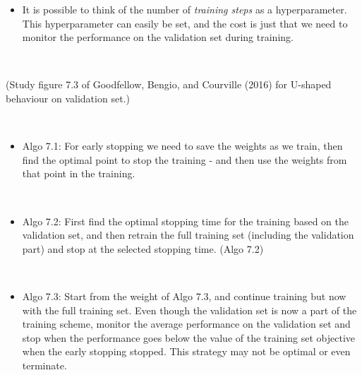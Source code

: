 \documentclass[
  ignorenonframetext,
]{beamer}
\providecommand{\tightlist}{%
  \setlength{\itemsep}{0pt}\setlength{\parskip}{0pt}}
\begin{document}
\begin{frame}
\begin{itemize}
\tightlist
\item
  It is possible to think of the number of \emph{training steps} as a
  hyperparameter. This hyperparameter can easily be set, and the cost is
  just that we need to monitor the performance on the validation set
  during training.
\end{itemize}

\(~\)

(Study figure 7.3 of Goodfellow, Bengio, and Courville (2016) for
U-shaped behaviour on validation set.)
\end{frame}

\begin{frame}
\(~\)

\begin{itemize}
\tightlist
\item
  Algo 7.1: For early stopping we need to save the weights as we train,
  then find the optimal point to stop the training - and then use the
  weights from that point in the training.
\end{itemize}

\(~\)

\begin{itemize}
\tightlist
\item
  Algo 7.2: First find the optimal stopping time for the training based
  on the validation set, and then retrain the full training set
  (including the validation part) and stop at the selected stopping
  time. (Algo 7.2)
\end{itemize}

\(~\)

\begin{itemize}
\tightlist
\item
  Algo 7.3: Start from the weight of Algo 7.3, and continue training but
  now with the full training set. Even though the validation set is now
  a part of the training scheme, monitor the average performance on the
  validation set and stop when the performance goes below the value of
  the training set objective when the early stopping stopped. This
  strategy may not be optimal or even terminate.
\end{itemize}
\end{frame}
\end{document}
